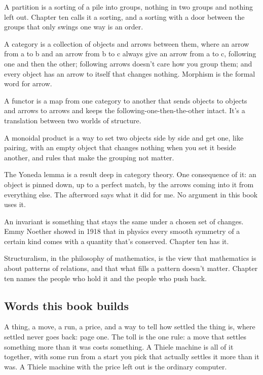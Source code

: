 \documentclass[11pt,twoside]{article}
\theoremstyle{thielethm}
\theoremstyle{thieledef}
\theoremstyle{thieledef}
\theoremstyle{thieledef}
\theoremstyle{thielethm}
\theoremstyle{thieleobs}
\theoremstyle{thielethm}
\begin{document}
A partition is a sorting of a pile into groups, nothing in two groups and nothing left out. Chapter ten calls it a sorting, and a sorting with a door between the groups that only swings one way is an order.

A category is a collection of objects and arrows between them, where an arrow from a to b and an arrow from b to c always give an arrow from a to c, following one and then the other; following arrows doesn't care how you group them; and every object has an arrow to itself that changes nothing. Morphism is the formal word for arrow.

A functor is a map from one category to another that sends objects to objects and arrows to arrows and keeps the following-one-then-the-other intact. It's a translation between two worlds of structure.

A monoidal product is a way to set two objects side by side and get one, like pairing, with an empty object that changes nothing when you set it beside another, and rules that make the grouping not matter.

The Yoneda lemma is a result deep in category theory. One consequence of it: an object is pinned down, up to a perfect match, by the arrows coming into it from everything else. The afterword says what it did for me. No argument in this book uses it.

An invariant is something that stays the same under a chosen set of changes. Emmy Noether showed in 1918 that in physics every smooth symmetry of a certain kind comes with a quantity that's conserved. Chapter ten has it.

Structuralism, in the philosophy of mathematics, is the view that mathematics is about patterns of relations, and that what fills a pattern doesn't matter. Chapter ten names the people who hold it and the people who push back.

\subsection{Words this book builds}

A thing, a move, a run, a price, and a way to tell how settled the thing is, where settled never goes back: page one. The toll is the one rule: a move that settles something more than it was costs something. A Thiele machine is all of it together, with some run from a start you pick that actually settles it more than it was. A Thiele machine with the price left out is the ordinary computer.
\end{document}
